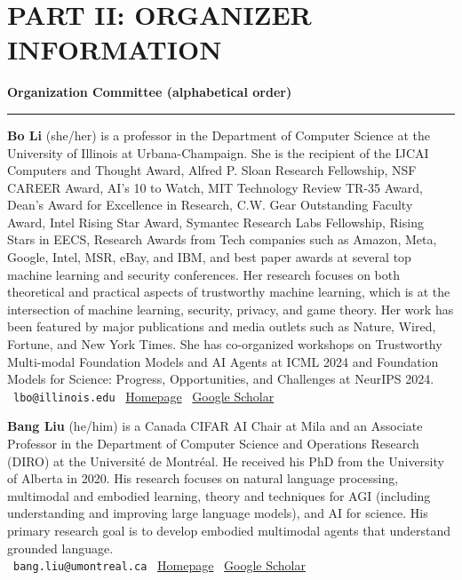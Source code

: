 \documentclass{article}
\newcommand{\orginfo}[3]{\\{\small\faEnvelope\ \texttt{#1} \hfill \faHome\ \href{https://#2}{Homepage} \hfill \faGraduationCap\ \href{https://scholar.google.com/citations?user=#3}{Google Scholar}}}
\newcommand{\sectiontitle}[1]{\noindent\textbf{\textcolor{neuripsblue}{#1}}\vspace{0.1cm}\hrule\vspace{0.2cm}}
\begin{document}
\section*{\textcolor{neuripsblue}{\large PART II: ORGANIZER INFORMATION}}
\vspace{-7pt}
\sectiontitle{Organization Committee (alphabetical order)}
\vspace{-2pt}
\textbf{Bo Li} (she/her) is a professor in the Department of Computer Science at the University of Illinois at Urbana-Champaign. She is the recipient of the IJCAI Computers and Thought Award, Alfred P. Sloan Research Fellowship, NSF CAREER Award, AI's 10 to Watch, MIT Technology Review TR-35 Award, Dean's Award for Excellence in Research, C.W. Gear Outstanding Faculty Award, Intel Rising Star Award, Symantec Research Labs Fellowship, Rising Stars in EECS, Research Awards from Tech companies such as Amazon, Meta, Google, Intel, MSR, eBay, and IBM, and best paper awards at several top machine learning and security conferences. Her research focuses on both theoretical and practical aspects of trustworthy machine learning, which is at the intersection of machine learning, security, privacy, and game theory. Her work has been featured by major publications and media outlets such as Nature, Wired, Fortune, and New York Times. She has co-organized workshops on Trustworthy Multi-modal Foundation Models and AI Agents at ICML 2024 and Foundation Models for Science: Progress, Opportunities, and Challenges at NeurIPS 2024.
\orginfo{lbo@illinois.edu}{aisecure.github.io}{K8vJkTcAAAAJ}

\textbf{Bang Liu} (he/him) is a Canada CIFAR AI Chair at Mila and an Associate Professor in the Department of Computer Science and Operations Research (DIRO) at the Université de Montréal. He received his PhD from the University of Alberta in 2020. His research focuses on natural language processing, multimodal and embodied learning, theory and techniques for AGI (including understanding and improving large language models), and AI for science. His primary research goal is to develop embodied multimodal agents that understand grounded language.
\orginfo{bang.liu@umontreal.ca}{https://www-labs.iro.umontreal.ca/~liubang/}{lmfAnP4AAAAJ}
\end{document}
